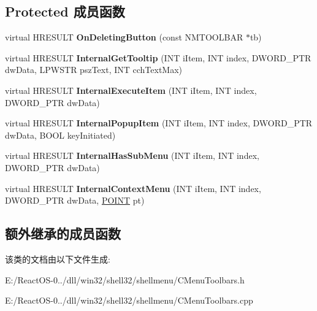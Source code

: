 \subsection*{Protected 成员函数}
\begin{DoxyCompactItemize}
\item 
\mbox{\label{class_c_menu_static_toolbar_ac4a72312e96febb0299e3f858ed33af3}} 
virtual H\+R\+E\+S\+U\+LT {\bfseries On\+Deleting\+Button} (const N\+M\+T\+O\+O\+L\+B\+AR $\ast$tb)
\item 
\mbox{\label{class_c_menu_static_toolbar_a29c8c4d36427ed3d36415476f6083802}} 
virtual H\+R\+E\+S\+U\+LT {\bfseries Internal\+Get\+Tooltip} (I\+NT i\+Item, I\+NT index, D\+W\+O\+R\+D\+\_\+\+P\+TR dw\+Data, L\+P\+W\+S\+TR psz\+Text, I\+NT cch\+Text\+Max)
\item 
\mbox{\label{class_c_menu_static_toolbar_ad0f35460afe0053f7f6c33a81c7985a3}} 
virtual H\+R\+E\+S\+U\+LT {\bfseries Internal\+Execute\+Item} (I\+NT i\+Item, I\+NT index, D\+W\+O\+R\+D\+\_\+\+P\+TR dw\+Data)
\item 
\mbox{\label{class_c_menu_static_toolbar_a54f6b1b3eed4239fd94ac20c6a086919}} 
virtual H\+R\+E\+S\+U\+LT {\bfseries Internal\+Popup\+Item} (I\+NT i\+Item, I\+NT index, D\+W\+O\+R\+D\+\_\+\+P\+TR dw\+Data, B\+O\+OL key\+Initiated)
\item 
\mbox{\label{class_c_menu_static_toolbar_a06b3bf85cc4261946327c464006479ff}} 
virtual H\+R\+E\+S\+U\+LT {\bfseries Internal\+Has\+Sub\+Menu} (I\+NT i\+Item, I\+NT index, D\+W\+O\+R\+D\+\_\+\+P\+TR dw\+Data)
\item 
\mbox{\label{class_c_menu_static_toolbar_a6e32dc3ea5fd4e6c1c2bd6b38f210740}} 
virtual H\+R\+E\+S\+U\+LT {\bfseries Internal\+Context\+Menu} (I\+NT i\+Item, I\+NT index, D\+W\+O\+R\+D\+\_\+\+P\+TR dw\+Data, \hyperlink{structtag_p_o_i_n_t}{P\+O\+I\+NT} pt)
\end{DoxyCompactItemize}
\subsection*{额外继承的成员函数}


该类的文档由以下文件生成\+:\begin{DoxyCompactItemize}
\item 
E\+:/\+React\+O\+S-\/0../dll/win32/shell32/shellmenu/C\+Menu\+Toolbars.\+h\item 
E\+:/\+React\+O\+S-\/0../dll/win32/shell32/shellmenu/C\+Menu\+Toolbars.\+cpp\end{DoxyCompactItemize}
